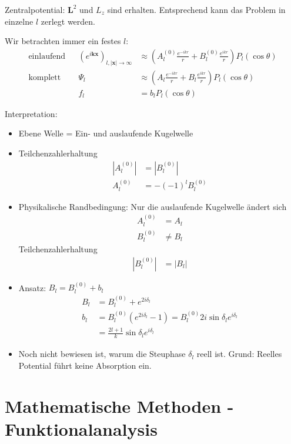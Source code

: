 \documentclass[11pt,a4paper]{report}
\begin{document}
Zentralpotential: $\mathbf{L}^2$ und $L_z$ sind erhalten. 
Entsprechend kann das Problem in einzelne $l$ zerlegt werden.

Wir betrachten immer ein festes $l$:
\begin{align*}
    \text{einlaufend} && (e^{i \mathbf{k} \mathbf{x}})_{l, |\mathbf{x}| \rightarrow \infty} &\approx \left(A_l^{(0)} \frac{e^{- i k r}}{r} + B_l^{(0)} \frac{e^{i k r}}{r}\right) P_l(\cos \theta) \\
    \text{komplett} && \Psi_l &\approx \left( A_l \frac{e^{-i k r}}{r} + B_l \frac{e^{i k r}}{r}\right) P_l(\cos \theta) \\
    && f_l &= b_l P_l(\cos \theta)
\end{align*}

Interpretation:
\begin{itemize}
    \item Ebene Welle = Ein- und auslaufende Kugelwelle
    \item Teilchenzahlerhaltung
    \begin{align*}
        |A_l^{(0)}| &= |B_l^{(0)}| \\
        A_l^{(0)} &= -(-1)^l B_l^{(0)}
    \end{align*}
    \item Physikalische Randbedingung: Nur die auslaufende Kugelwelle ändert sich
    \begin{align*}
        A_l^{(0)} &= A_l \\
        B_l^{(0)} &\neq B_l
    \end{align*}
    Teilchenzahlerhaltung
    \begin{align*}
        |B_l^{(0)}| &= |B_l|
    \end{align*}
    \item Ansatz: $B_l = B_l^{(0)} + b_l$
    \begin{align*}
        B_l &= B_l^{(0)} + e^{2 i \delta_l} \\
        b_l &= B_l^{(0)} (e^{2 i \delta_l} - 1) = B_l^{(0)} 2 i \sin \delta_l e^{i \delta_l} \\
        &= \frac{2 l + 1}{k} \sin \delta_l e^{i \delta_l}
    \end{align*}
    \item Noch nicht bewiesen ist, warum die Steuphase $\delta_l$ reell ist. Grund: Reelles Potential führt keine Absorption ein.
\end{itemize}

\section{Mathematische Methoden - Funktionalanalysis}
\end{document}
